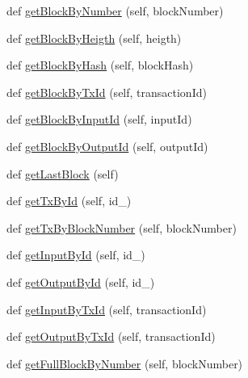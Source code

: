 \begin{DoxyCompactItemize}
\item 
def \hyperlink{classpostgreDb_1_1DatabaseWrapper_1_1DatabaseWrapper_a0376de0201911e1e3d3e534633d085c7}{get\+Block\+By\+Number} (self, block\+Number)
\item 
def \hyperlink{classpostgreDb_1_1DatabaseWrapper_1_1DatabaseWrapper_a8f18330c2e05d079309582ee8815f69c}{get\+Block\+By\+Heigth} (self, heigth)
\item 
def \hyperlink{classpostgreDb_1_1DatabaseWrapper_1_1DatabaseWrapper_a1b392365805aa2784a22e8d9195d8522}{get\+Block\+By\+Hash} (self, block\+Hash)
\item 
def \hyperlink{classpostgreDb_1_1DatabaseWrapper_1_1DatabaseWrapper_a74da0e565a62fbc30b4a7db8cb0f25ec}{get\+Block\+By\+Tx\+Id} (self, transaction\+Id)
\item 
def \hyperlink{classpostgreDb_1_1DatabaseWrapper_1_1DatabaseWrapper_a8dacb18eb917cbced91f6ed834f29ede}{get\+Block\+By\+Input\+Id} (self, input\+Id)
\item 
def \hyperlink{classpostgreDb_1_1DatabaseWrapper_1_1DatabaseWrapper_a6f86656bdf99b8400c6bdc61461b48d9}{get\+Block\+By\+Output\+Id} (self, output\+Id)
\item 
def \hyperlink{classpostgreDb_1_1DatabaseWrapper_1_1DatabaseWrapper_afa563e6c3d2172c38de480d11758a33b}{get\+Last\+Block} (self)
\item 
def \hyperlink{classpostgreDb_1_1DatabaseWrapper_1_1DatabaseWrapper_a0fe5f099090d61791d332620790adca8}{get\+Tx\+By\+Id} (self, id\+\_\+)
\item 
def \hyperlink{classpostgreDb_1_1DatabaseWrapper_1_1DatabaseWrapper_a46d7b014b72d16f17028bbefbdad7fa7}{get\+Tx\+By\+Block\+Number} (self, block\+Number)
\item 
def \hyperlink{classpostgreDb_1_1DatabaseWrapper_1_1DatabaseWrapper_a147fc4b25f9ffb9fd5ca5ed893452cad}{get\+Input\+By\+Id} (self, id\+\_\+)
\item 
def \hyperlink{classpostgreDb_1_1DatabaseWrapper_1_1DatabaseWrapper_a88b226fdee21bf6f97c789e5839f7b31}{get\+Output\+By\+Id} (self, id\+\_\+)
\item 
def \hyperlink{classpostgreDb_1_1DatabaseWrapper_1_1DatabaseWrapper_a9f8e2c7d80b07e8ff0fcaa07c3a642ef}{get\+Input\+By\+Tx\+Id} (self, transaction\+Id)
\item 
def \hyperlink{classpostgreDb_1_1DatabaseWrapper_1_1DatabaseWrapper_ac09d8bc8495cbe3e2e0a507b1d0c1ba0}{get\+Output\+By\+Tx\+Id} (self, transaction\+Id)
\item 
def \hyperlink{classpostgreDb_1_1DatabaseWrapper_1_1DatabaseWrapper_a232bcbd789add357dde44cf71c9d50ec}{get\+Full\+Block\+By\+Number} (self, block\+Number)

\end{DoxyCompactItemize}
